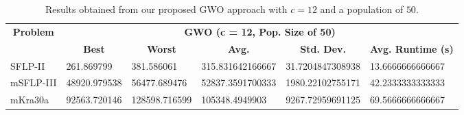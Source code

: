 \begin{table}[h!]
	\begin{adjustwidth}{-1.18in}{}
		\centering
		\begin{tabular}{|l|l|l|l|l|l|}
			\hline
			\multicolumn{1}{|c|}{\multirow{2}{*}{\textbf{Problem}}} & \multicolumn{5}{c|}{\textbf{GWO (c = 12, Pop. Size of 50)}} \\ \cline{2-6} 
			\multicolumn{1}{|c|}{}                                  & \multicolumn{1}{c|}{\textbf{Best}} & \multicolumn{1}{c|}{\textbf{Worst}} & \multicolumn{1}{c|}{\textbf{Avg.}} & \multicolumn{1}{c|}{\textbf{Std. Dev.}} & \multicolumn{1}{c|}{\textbf{Avg. Runtime (s)}} \\ \hline
			SFLP-II                                                 & 261.869799                                  & 381.586061                                   & 315.831642166667                      & 31.7204847308938                                 & 13.6666666666667                                  \\ \hline
			mSFLP-III                                               & 48920.979538                                & 56477.689476                                 & 52837.3591700333						         & 1980.22102755171                              & 42.2333333333333                              \\ \hline
			mKra30a                                               & 92563.720146                                & 128598.716599                                 &
			105348.4949903							&
			9267.72959691125							&
			69.5666666666667						\\ \hline
		\end{tabular}
	\end{adjustwidth}
	\caption{Results obtained from our proposed GWO approach with $c = 12$ and a population of $50$.}
	\label{approach-gwo-c12-p50-results}
\end{table}

